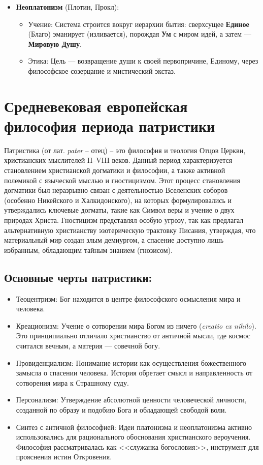 \documentclass[12pt,a4paper]{article}
\begin{document}
\begin{itemize}
		\item \textbf{Неоплатонизм} (Плотин, Прокл):
		\begin{itemize}
			\item Учение: Система строится вокруг иерархии бытия: сверхсущее \textbf{Единое} (Благо) эманирует (изливается), порождая \textbf{Ум} с миром идей, а затем --- \textbf{Мировую Душу}.
			\item Этика: Цель --- возвращение души к своей первопричине, Единому, через философское созерцание и мистический экстаз.
		\end{itemize}
	\end{itemize}
	
	\section{Средневековая европейская философия периода патристики~\checkmark}
	
	Патристика (от лат. \textit{pater} -- отец) -- это философия и теология Отцов Церкви, христианских мыслителей II--VIII веков. Данный период характеризуется становлением христианской догматики и философии, а также активной полемикой с языческой мыслью и гностицизмом. Этот процесс становления догматики был неразрывно связан с деятельностью Вселенских соборов (особенно Никейского и Халкидонского), на которых формулировались и утверждались ключевые догматы, такие как Символ веры и учение о двух природах Христа. Гностицизм представлял особую угрозу, так как предлагал альтернативную христианству эзотерическую трактовку Писания, утверждая, что материальный мир создан злым демиургом, а спасение доступно лишь избранным, обладающим тайным знанием (гнозисом).
	\subsection{Основные черты патристики:}
	\begin{itemize}
		\item Теоцентризм: Бог находится в центре философского осмысления мира и человека.
		\item Креационизм: Учение о сотворении мира Богом из ничего (\textit{creatio ex nihilo}). Это принципиально отличало христианство от античной мысли, где космос считался вечным, а материя — совечной богу.
		\item Провиденциализм: Понимание истории как осуществления божественного замысла о спасении человека. История обретает смысл и направленность от сотворения мира к Страшному суду.
		\item Персонализм: Утверждение абсолютной ценности человеческой личности, созданной по образу и подобию Бога и обладающей свободой воли.
		\item Синтез с античной философией: Идеи платонизма и неоплатонизма активно использовались для рационального обоснования христианского вероучения. Философия рассматривалась как <<служанка богословия>>, инструмент для прояснения истин Откровения.
	\end{itemize}
	
\end{document}

